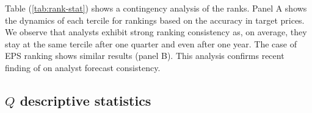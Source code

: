 \documentclass{article}
\begin{document}
Table (\ref{tab:rank-stat}) shows a contingency analysis of the ranks. 
Panel A shows the dynamics of each tercile for rankings based on the accuracy in target prices. We observe that analysts exhibit strong ranking consistency as, on average, they stay at the same tercile after one quarter and even after one year. The case of EPS ranking shows similar results (panel B). This analysis confirms recent finding of \cite{hilary2013} on analyst forecast consistency. 






\subsection{$Q$ descriptive statistics}
\end{document}
